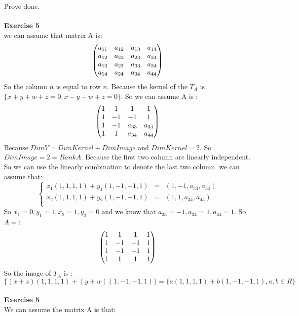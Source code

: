 \documentclass[12pt]{amsart}
\begin{document}
Prove done.\\
\\
\textbf {Exercise 5} \\
we can assume that matrix A is:\\
$$\begin{pmatrix} 
a_{11} & a_{12} & a_{13} & a_{14}\\
a_{12} & a_{22} & a_{23} & a_{24}\\
a_{13} & a_{23} & a_{33} & a_{34}\\
a_{14} & a_{24} & a_{34} & a_{44}
\end{pmatrix}\\
$$
So the column $n$ is equal to row $n$. Because the kernel of the $T_A$ is $\{x+y+w+z=0,x-y-w+z=0\}$. So we can assume A is :\\
$$\begin{pmatrix} 
1 & 1 & 1 & 1\\
1 & -1 & -1 & 1\\
1 & -1 & a_{33} & a_{34}\\
1 & 1 & a_{34} & a_{44}
\end{pmatrix}\\
$$
Because $Dim V = DimKernel + DimImage$ and $DimKernel = 2$. So $DimImage = 2 = RankA$. Because the first two column are linearly independent. So we can use the linearly combination to denote the last two column. we can assume that:\\
$$ \left\{
\begin{aligned}
x_1(1,1,1,1) + y_1(1,-1,-1,1) & = & (1,-1,a_{33},a_{34}) \\
x_2(1,1,1,1) + y_2(1,-1,-1,1) & = & (1,1,a_{34},a_{44}) \\
\end{aligned}
\right.
$$
So $x_1 = 0, y_1 = 1, x_2 = 1, y_2 = 0$ and we know that $a_{33} = -1,a_{34} = 1,a_{44} = 1$. So $A = $:\\
$$\begin{pmatrix} 
1 & 1 & 1 & 1\\
1 & -1 & -1 & 1\\
1 & -1 & -1 & 1\\
1 & 1 & 1 & 1
\end{pmatrix}\\
$$
So the image of $T_A$ is :\\
$\{(x + z)(1,1,1,1)+(y + w)(1,-1,-1,1)\} = \{ a(1,1,1,1)+b(1,-1,-1,1), a,b \in R\} $\\
\\
\textbf {Exercise 5}\\
We can assume the matrix A is that:
\end{document}
